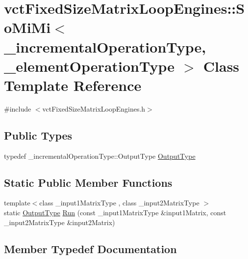\hypertarget{classvct_fixed_size_matrix_loop_engines_1_1_so_mi_mi}{}\section{vct\+Fixed\+Size\+Matrix\+Loop\+Engines\+:\+:So\+Mi\+Mi$<$ \+\_\+incremental\+Operation\+Type, \+\_\+element\+Operation\+Type $>$ Class Template Reference}
\label{classvct_fixed_size_matrix_loop_engines_1_1_so_mi_mi}


{\ttfamily \#include $<$vct\+Fixed\+Size\+Matrix\+Loop\+Engines.\+h$>$}

\subsection*{Public Types}
\begin{DoxyCompactItemize}
\item 
typedef \+\_\+incremental\+Operation\+Type\+::\+Output\+Type \hyperlink{classvct_fixed_size_matrix_loop_engines_1_1_so_mi_mi_ad85308241e1812e572d025b957d12d06}{Output\+Type}
\end{DoxyCompactItemize}
\subsection*{Static Public Member Functions}
\begin{DoxyCompactItemize}
\item 
{\footnotesize template$<$class \+\_\+input1\+Matrix\+Type , class \+\_\+input2\+Matrix\+Type $>$ }\\static \hyperlink{classvct_fixed_size_matrix_loop_engines_1_1_so_mi_mi_ad85308241e1812e572d025b957d12d06}{Output\+Type} \hyperlink{classvct_fixed_size_matrix_loop_engines_1_1_so_mi_mi_a90354f34be48ee0df4020ca472302307}{Run} (const \+\_\+input1\+Matrix\+Type \&input1\+Matrix, const \+\_\+input2\+Matrix\+Type \&input2\+Matrix)
\end{DoxyCompactItemize}


\subsection{Member Typedef Documentation}
\hypertarget{classvct_fixed_size_matrix_loop_engines_1_1_so_mi_mi_ad85308241e1812e572d025b957d12d06}{}
